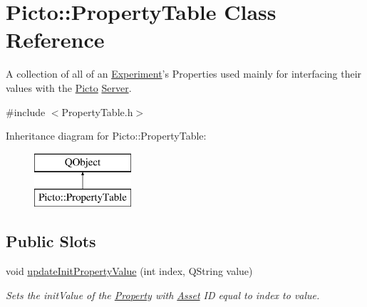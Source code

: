 \hypertarget{class_picto_1_1_property_table}{\section{Picto\-:\-:Property\-Table Class Reference}
\label{class_picto_1_1_property_table}
}


A collection of all of an \hyperlink{class_picto_1_1_experiment}{Experiment}'s Properties used mainly for interfacing their values with the \hyperlink{namespace_picto}{Picto} \hyperlink{class_server}{Server}.  




{\ttfamily \#include $<$Property\-Table.\-h$>$}

Inheritance diagram for Picto\-:\-:Property\-Table\-:\begin{figure}[H]
\begin{center}
\leavevmode
\includegraphics[height=2.000000cm]{class_picto_1_1_property_table}
\end{center}
\end{figure}
\subsection*{Public Slots}
\begin{DoxyCompactItemize}
\item 
void \hyperlink{class_picto_1_1_property_table_a10a2fd7b9371799b2fe0934dc24e186e}{update\-Init\-Property\-Value} (int index, Q\-String value)
\begin{DoxyCompactList}\small\item\em Sets the init\-Value of the \hyperlink{class_picto_1_1_property}{Property} with \hyperlink{class_picto_1_1_asset}{Asset} I\-D equal to index to value. \end{DoxyCompactList}\end{DoxyCompactItemize}
